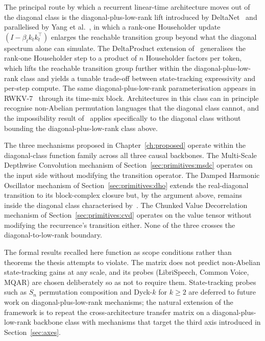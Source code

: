 The principal route by which a recurrent linear-time architecture
moves out of the diagonal class is the diagonal-plus-low-rank lift
introduced by DeltaNet~\cite{schlag2021deltanet} and parallelised
by Yang et al.~\cite{yang2024deltanet}, in which a rank-one
Householder update $(I - \beta_{t} k_{t} k_{t}^{\top})$ enlarges
the reachable transition group beyond what the diagonal spectrum
alone can simulate. The DeltaProduct extension
of~\citet{siems2025deltaproduct} generalises the rank-one
Householder step to a product of $n$ Householder factors per token,
which lifts the reachable transition group further within the
diagonal-plus-low-rank class and yields a tunable trade-off between
state-tracking expressivity and per-step compute. The same
diagonal-plus-low-rank parameterisation appears in
RWKV-7~\cite{peng2025rwkv7} through its time-mix block.
Architectures in this class can in principle recognise non-Abelian
permutation languages that the diagonal class cannot, and the
impossibility result of~\citet{merrill2024illusion} applies
specifically to the diagonal class without bounding the
diagonal-plus-low-rank class above.

The three mechanisms proposed in Chapter~\ref{ch:proposed} operate
within the diagonal-class function family across all three causal
backbones. The Multi-Scale Depthwise Convolution mechanism of
Section~\ref{sec:primitives:msdc} operates on the input side without
modifying the transition operator. The Damped Harmonic Oscillator
mechanism of Section~\ref{sec:primitives:dho} extends the
real-diagonal transition to its block-complex closure but, by the
argument above, remains inside the diagonal class characterised
by~\citet{sarrof2024expressive}. The Chunked Value Decorrelation
mechanism of Section~\ref{sec:primitives:cvd} operates on the value
tensor without modifying the recurrence's transition either. None
of the three crosses the diagonal-to-low-rank boundary.

The formal results recalled here function as scope conditions
rather than theorems the thesis attempts to violate. The matrix
does not predict non-Abelian state-tracking gains at any scale,
and its probes (LibriSpeech, Common Voice, MQAR) are chosen
deliberately so as not to require them. State-tracking probes
such as $S_{n}$ permutation composition and Dyck-$k$ for
$k \ge 2$ are deferred to future work on diagonal-plus-low-rank
mechanisms; the natural extension of the framework is to repeat
the cross-architecture transfer matrix on a
diagonal-plus-low-rank backbone class with mechanisms that
target the third axis introduced in Section~\ref{sec:axes}.
